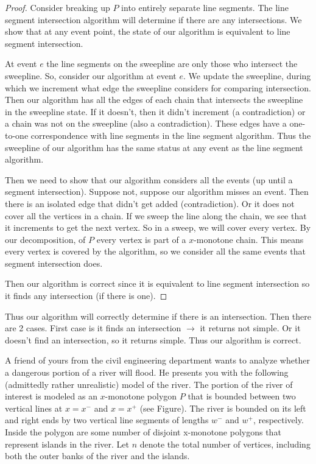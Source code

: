 \documentclass[11pt]{article}
\begin{document}
\begin{proof}
    Consider breaking up $P$ into entirely separate line segments. 
    The line segment intersection algorithm will determine if there are any intersections.
    We show that at any event point, the state of our algorithm is equivalent to line segment intersection.

    At event $e$ the line segments on the sweepline are only those who intersect the sweepline.
    So, consider our algorithm at event $e$. We update the sweepline,
    during which we increment what edge the sweepline considers for comparing intersection. 
    Then our algorithm has all the edges of each chain that intersects the sweepline in the sweepline state.
    If it doesn't, then it didn't increment (a contradiction) or a chain was not on the sweepline (also a contradiction).
    These edges have a one-to-one correspondence with line segments in the line segment algorithm.
    Thus the sweepline of our algorithm has the same status at any event as the line segment algorithm.

    Then we need to show that our algorithm considers all the events (up until a segment intersection).
    Suppose not, suppose our algorithm misses an event. Then there is an isolated edge that didn't get added (contradiction).
    Or it does not cover all the vertices in a chain. If we sweep the line along the chain, we see that it 
    increments to get the next vertex. So in a sweep, we will cover every vertex. By our decomposition, of $P$
    every vertex is part of a $x$-monotone chain. This means every vertex is covered by the algorithm,
    so we consider all the same events that segment intersection does. 

    Then our algorithm is correct since it is equivalent to line segment intersection so it finds any intersection (if there is one).
\end{proof}

Thus our algorithm will correctly determine if there is an intersection. Then there are 2 cases.
First case is it finds an intersection $\rightarrow$ it returns not simple. Or it doesn't find an intersection, so
it returns simple. Thus our algorithm is correct.









A friend of yours from the civil engineering department wants to analyze whether
a dangerous portion of a river will flood. He presents you with the following
(admittedly rather unrealistic) model of the river. The portion of the river of
interest is modeled as an $x$-monotone polygon $P$ that is bounded between two
vertical lines at $x = x^-$ and $x = x^+$ (see Figure). The river is bounded on
its left and right ends by two vertical line segments of lengths $w^-$ and
$w^+$, respectively. Inside the polygon are some number of disjoint x-monotone
polygons that represent islands in the river.  Let $n$ denote the total number
of vertices, including both the outer banks of the river and the islands.
\end{document}
